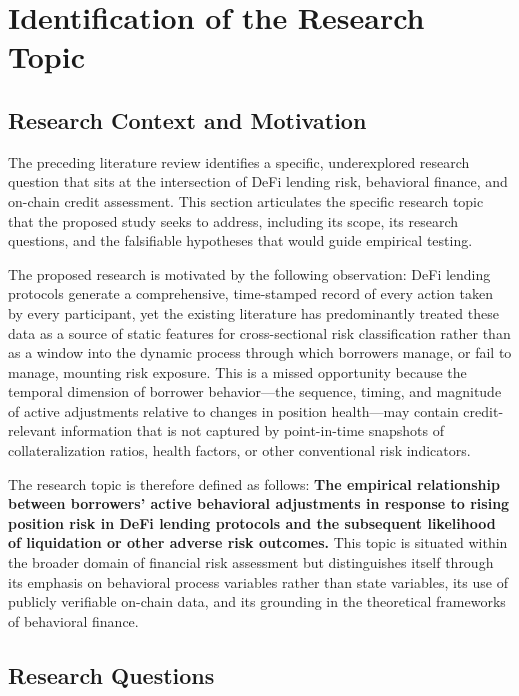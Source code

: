 \section{Identification of the Research Topic}

\subsection{Research Context and Motivation}

The preceding literature review identifies a specific, underexplored research question that sits at the intersection of DeFi lending risk, behavioral finance, and on-chain credit assessment. This section articulates the specific research topic that the proposed study seeks to address, including its scope, its research questions, and the falsifiable hypotheses that would guide empirical testing.

The proposed research is motivated by the following observation: DeFi lending protocols generate a comprehensive, time-stamped record of every action taken by every participant, yet the existing literature has predominantly treated these data as a source of static features for cross-sectional risk classification rather than as a window into the dynamic process through which borrowers manage, or fail to manage, mounting risk exposure. This is a missed opportunity because the temporal dimension of borrower behavior—the sequence, timing, and magnitude of active adjustments relative to changes in position health—may contain credit-relevant information that is not captured by point-in-time snapshots of collateralization ratios, health factors, or other conventional risk indicators.

The research topic is therefore defined as follows: \textbf{The empirical relationship between borrowers' active behavioral adjustments in response to rising position risk in DeFi lending protocols and the subsequent likelihood of liquidation or other adverse risk outcomes.} This topic is situated within the broader domain of financial risk assessment but distinguishes itself through its emphasis on behavioral process variables rather than state variables, its use of publicly verifiable on-chain data, and its grounding in the theoretical frameworks of behavioral finance.

\subsection{Research Questions}

